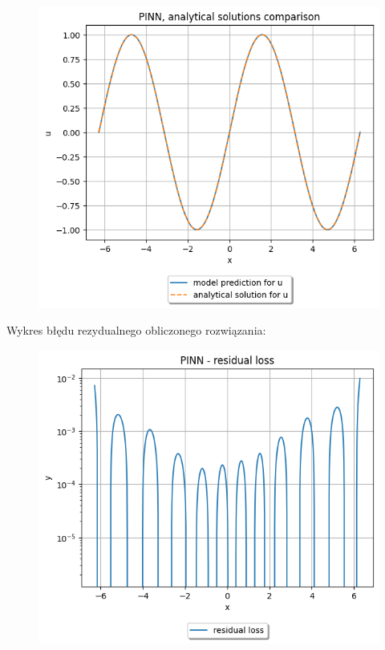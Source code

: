 \documentclass{article}
\begin{document}
\begin{figure}[H]
  \includegraphics[width=\linewidth]{figures/1.png}
\end{figure}

Wykres błędu rezydualnego obliczonego rozwiązania:\\

\begin{figure}[H]
  \includegraphics[width=\linewidth]{figures/1_residual.png}
\end{figure}
\end{document}
